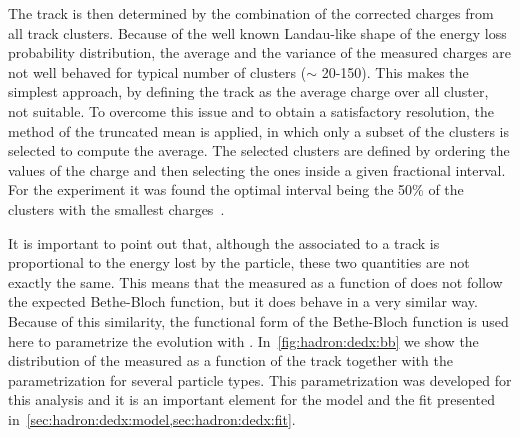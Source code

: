 The track \dedx is then determined by the combination of the corrected 
charges from all track clusters. Because of the well known Landau-like shape of the
energy loss probability distribution, the average and the variance
of the measured charges are not well behaved for typical number of clusters
($\sim$ 20-150). This makes the simplest approach, by defining the track \dedx
as the average charge over all cluster, not suitable. 
To overcome this issue and to obtain a satisfactory \dedx resolution,
the method of the truncated mean is applied, in which only a subset of the clusters
is selected to compute the average. The selected clusters are defined by ordering
the values of the charge and then selecting the ones inside a given fractional interval.
For the \NASixtyOne experiment it was found the optimal interval being the 50\%
of the clusters with the smallest charges~\cite{GaborVeresThesis}.

It is important to point out that, although the \dedx associated to
a track is proportional to the energy lost by the particle,
these two quantities are not exactly the same. This
means that the measured \meandedx as a function of \pp
does not follow the expected Bethe-Bloch function, but it does
behave in a very similar way. Because of this similarity,
the functional form of the Bethe-Bloch function
is used here to parametrize the \meandedx evolution
with \pp. In~\cref{fig:hadron:dedx:bb} we show the distribution of
the measured \dedx as a function of the track \pp
together with the \meandedx parametrization for 
several particle types. This parametrization was developed
for this analysis and it is an important element for the \dedx model
and the \dedx fit presented in~\cref{sec:hadron:dedx:model,sec:hadron:dedx:fit}.


